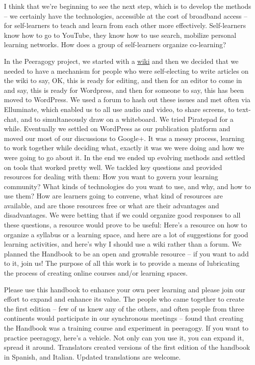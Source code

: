 I think that we're beginning to see the next step, which is to develop
the methods -- we certainly have the technologies, accessible at the
cost of broadband access -- for self-learners to teach and learn from
each other more effectively. Self-learners know how to go to YouTube,
they know how to use search, mobilize personal learning networks. How
does a group of self-learners organize co-learning?

In the Peeragogy project, we started with a
\href{http://socialmediaclassroom.com/host/peeragogy/}{wiki} and then we
decided that we needed to have a mechanism for people who were
self-electing to write articles on the wiki to say, OK, this is ready
for editing, and then for an editor to come in and say, this is ready
for Wordpress, and then for someone to say, this has been moved to
WordPress. We used a forum to hash out these issues and met often via
Elluminate, which enabled us to all use audio and video, to share
screens, to text-chat, and to simultaneously draw on a whiteboard. We
tried Piratepad for a while. Eventually we settled on WordPress as our
publication platform and moved our most of our discussions to Google+.
It was a messy process, learning to work together while deciding what,
exactly it was we were doing and how we were going to go about it. In
the end we ended up evolving methods and settled on tools that worked
pretty well. We tackled key questions and provided resources for dealing
with them: How you want to govern your learning community? What kinds of
technologies do you want to use, and why, and how to use them? How are
learners going to convene, what kind of resources are available, and are
those resources free or what are their advantages and disadvantages. We
were betting that if we could organize good responses to all these
questions, a resource would prove to be useful: Here's a resource on how
to organize a syllabus or a learning space, and here are a lot of
suggestions for good learning activities, and here's why I should use a
wiki rather than a forum. We planned the Handbook to be an open and
growable resource -- if you want to add to it, join us! The purpose of
all this work is to provide a means of lubricating the process of
creating online courses and/or learning spaces.

Please use this handbook to enhance your own peer learning and please
join our effort to expand and enhance its value. The people who came
together to create the first edition -- few of us knew any of the
others, and often people from three continents would participate in our
synchronous meetings -- found that creating the Handbook was a training
course and experiment in peeragogy. If you want to practice peeragogy,
here's a vehicle. Not only can you use it, you can expand it, spread it
around. Translators created versions of the first edition
of the handbook in Spanish, and Italian. Updated translations are welcome.

